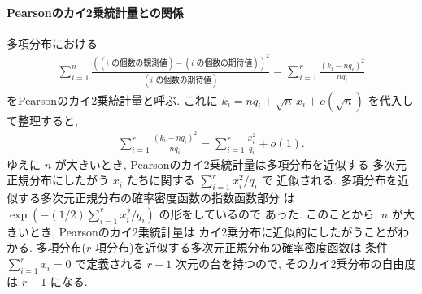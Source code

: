 \documentclass[12pt,twoside]{jarticle}
\theoremstyle{jplain}
\theoremstyle{jplain}
\theoremstyle{jplain}
\numberwithin{theorem}{section}
\numberwithin{equation}{section}
\numberwithin{figure}{section}
\numberwithin{table}{section}
\begin{document}
\paragraph{Pearsonのカイ2乗統計量との関係}
多項分布における
\begin{align*}
\sum_{i=1}^n
\frac
{((\text{$i$ の個数の観測値})-(\text{$i$ の個数の期待値}))^2}
{(\text{$i$ の個数の期待値})}
=\sum_{i=1}^r \frac{(k_i-nq_i)^2}{nq_i}
\end{align*}
をPearsonのカイ2乗統計量と呼ぶ. 
これに $k_i=nq_i+\sqrt{n}\,x_i+o(\sqrt{n})$ を代入して整理すると, 
\begin{align*}
\sum_{i=1}^r \frac{(k_i-nq_i)^2}{nq_i}
=\sum_{i=1}^r \frac{x_i^2}{q_i} + o(1).
\end{align*}
ゆえに $n$ が大きいとき, Pearsonのカイ2乗統計量は多項分布を近似する
多次元正規分布にしたがう $x_i$ たちに関する $\sum_{i=1}^r x_i^2/q_i$ で
近似される. 多項分布を近似する多次元正規分布の確率密度函数の指数函数部分
は $\exp\left(-(1/2)\sum_{i=1}^r x_i^2/q_i\right)$ の形をしているので
あった. このことから, $n$ が大きいとき, Pearsonのカイ2乗統計量は
カイ2乗分布に近似的にしたがうことがわかる.
多項分布($r$ 項分布)を近似する多次元正規分布の確率密度函数は 
条件 $\sum_{i=1}^r x_i=0$ で定義される $r-1$ 次元の台を持つので, 
そのカイ2乗分布の自由度は $r-1$ になる. 
\end{document}
